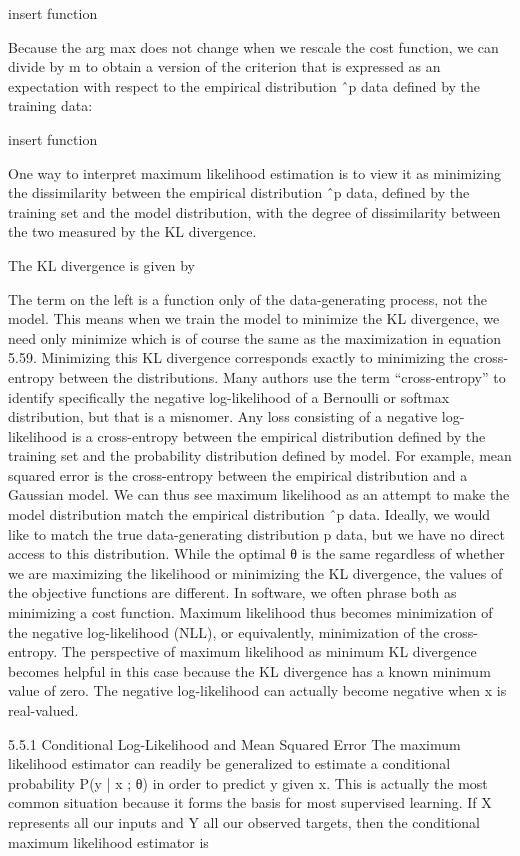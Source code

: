 \documentclass[11pt]{article}
\begin{document}
    insert function

Because the arg max does not change when we rescale the cost function, we can divide by m to obtain a version of the criterion that is expressed as an expectation with respect to the empirical distribution ˆp data deﬁned by the training data:

    insert function

One way to interpret maximum likelihood estimation is to view it as minimizing the dissimilarity between the empirical distribution ˆp data, deﬁned by the training set and the model distribution, with the degree of dissimilarity between the two measured by the KL divergence.

The KL divergence is given by

The term on the left is a function only of the data-generating process, not the model.
This means when we train the model to minimize the KL divergence, we need only minimize which is of course the same as the maximization in equation 5.59.
Minimizing this KL divergence corresponds exactly to minimizing the cross-entropy between the distributions.
Many authors use the term “cross-entropy” to identify speciﬁcally the negative log-likelihood of a Bernoulli or softmax distribution, but that is a misnomer.
Any loss consisting of a negative log-likelihood is a cross-entropy between the empirical distribution deﬁned by the training set and the probability distribution deﬁned by model.
For example, mean squared error is the cross-entropy between the empirical distribution and a Gaussian model.
We can thus see maximum likelihood as an attempt to make the model distribution match the empirical distribution ˆp data.
Ideally, we would like to match the true data-generating distribution p data, but we have no direct access to this distribution.
While the optimal θ is the same regardless of whether we are maximizing the likelihood or minimizing the KL divergence, the values of the objective functions are diﬀerent.
In software, we often phrase both as minimizing a cost function.
Maximum likelihood thus becomes minimization of the negative log-likelihood
(NLL), or equivalently, minimization of the cross-entropy. The perspective of
maximum likelihood as minimum KL divergence becomes helpful in this case
because the KL divergence has a known minimum value of zero. The negative
log-likelihood can actually become negative when x is real-valued.

5.5.1 Conditional Log-Likelihood and Mean Squared Error
The maximum likelihood estimator can readily be generalized to estimate a conditional probability P(y | x ; θ) in order to predict y given x.
This is actually the most common situation because it forms the basis for most supervised learning.
If X represents all our inputs and Y all our observed targets, then the conditional maximum likelihood estimator is
\end{document}
